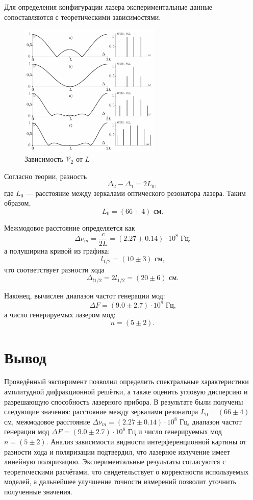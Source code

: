 \documentclass[a4paper]{article}
\begin{document}
Для определения конфигурации лазера экспериментальные данные сопоставляются с теоретическими зависимостями.

\begin{figure}[!h]
    \centering
    \includegraphics[width=0.6\textwidth]{5.png}
    \caption{Зависимость $\mathcal{V}_2$ от $L$}
\end{figure}

Согласно теории, разность 
\[
\Delta_2 - \Delta_1 = 2L_0,
\]
где $L_0$ — расстояние между зеркалами оптического резонатора лазера. Таким образом,
\[
L_0 = (66 \pm 4) \text{ см.}
\]

Межмодовое расстояние определяется как
\[
\Delta \nu_m = \frac{c}{2L} = (2.27 \pm 0.14) \cdot 10^8 \text{ Гц,}
\]
а полуширина кривой из графика:
\[
l_{1/2} = (10 \pm 3) \text{ см,}
\]
что соответствует разности хода
\[
\Delta_{l1/2} = 2l_{1/2} = (20 \pm 6) \text{ см.}
\]

Наконец, вычислен диапазон частот генерации мод:
\[
\Delta F = \left( 9.0\pm 2.7\right) \cdot 10^8 \text{ Гц,}
\]
а число генерируемых лазером мод:
\[
n = \left( 5\pm 2\right).
\]

\section{Вывод}
Проведённый эксперимент позволил определить спектральные характеристики амплитудной дифракционной решётки, а также оценить угловую дисперсию и разрешающую способность лазерного прибора. В результате были получены следующие значения: расстояние между зеркалами резонатора $L_0 = (66 \pm 4)$ см, межмодовое расстояние $\Delta \nu_m = (2.27 \pm 0.14)\cdot10^8$ Гц, диапазон частот генерации мод $\Delta F = (9.0 \pm 2.7)\cdot10^8$ Гц и число генерируемых мод $n = (5 \pm 2)$. Анализ зависимости видности интерференционной картины от разности хода и поляризации подтвердил, что лазерное излучение имеет линейную поляризацию. Экспериментальные результаты согласуются с теоретическими расчётами, что свидетельствует о корректности используемых моделей, а дальнейшее улучшение точности измерений позволит уточнить полученные значения.
\end{document}
